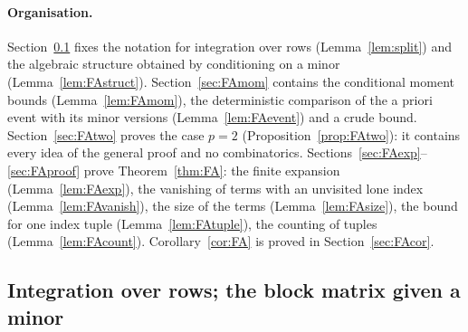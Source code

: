 \paragraph{Organisation.} Section~\ref{sec:FAfub} fixes the notation for integration over rows (Lemma~\ref{lem:split}) and the algebraic structure obtained by conditioning on a minor (Lemma~\ref{lem:FAstruct}).
Section~\ref{sec:FAmom} contains the conditional moment bounds (Lemma~\ref{lem:FAmom}), the deterministic comparison of the a priori event with its minor versions (Lemma~\ref{lem:FAevent}) and a crude bound.
Section~\ref{sec:FAtwo} proves the case $p=2$ (Proposition~\ref{prop:FAtwo}): it contains every idea of the general proof and no combinatorics.
Sections~\ref{sec:FAexp}--\ref{sec:FAproof} prove Theorem~\ref{thm:FA}: the finite expansion (Lemma~\ref{lem:FAexp}), the vanishing of terms with an unvisited lone index (Lemma~\ref{lem:FAvanish}),
the size of the terms (Lemma~\ref{lem:FAsize}), the bound for one index tuple (Lemma~\ref{lem:FAtuple}), the counting of tuples (Lemma~\ref{lem:FAcount}). Corollary~\ref{cor:FA} is proved in Section~\ref{sec:FAcor}.

\subsection{Integration over rows; the block matrix given a minor}\label{sec:FAfub}
